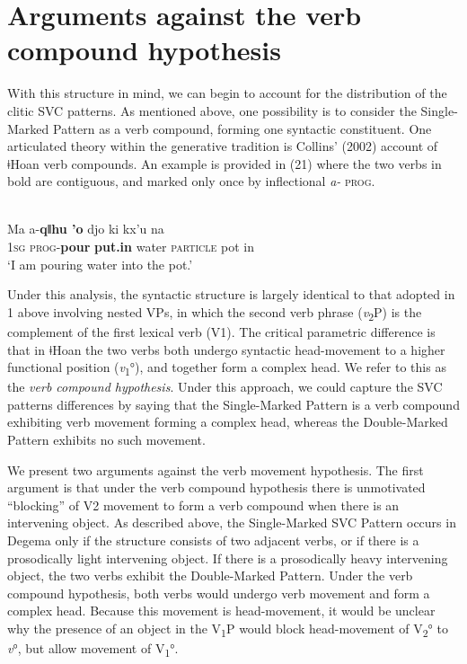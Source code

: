 \documentclass[output=paper]{langsci/langscibook}
\begin{document}
\section{Arguments against the verb compound hypothesis}
\label{bkm:Ref449523633}
With this structure in mind, we can begin to account for the distribution of the clitic SVC patterns. As mentioned above, one possibility is to consider the Single-Marked Pattern as a verb compound, forming one syntactic constituent. One articulated theory within the generative tradition is Collins’ (2002) account of ǂHoan verb compounds. An example is provided in (21) where the two verbs in bold are contiguous, and marked only once by inflectional \textit{a- }\textsc{prog}.

\ea
{}\\
\gll  Ma  a-\textbf{qǁhu    {\textbar}’o}    djo    ki      kx’u    na\\
     \textsc{1sg}   \textsc{prog}{}-\textbf{pour}  \textbf{put.in}  water  \textsc{particle}  pot    in\\
\glt ‘I am pouring water into the pot.’ \citep[1]{Collins2002}
\z

Under this analysis, the syntactic structure is largely identical to that adopted in 1 above involving nested VPs, in which the second verb phrase (\textit{v}\textsubscript{2}P) is the complement of the first lexical verb (V1). The critical parametric difference is that in ǂHoan the two verbs both undergo syntactic head-movement to a higher functional position (\textit{v}\textsubscript{1}°), and together form a complex head. We refer to this as the \textit{verb compound hypothesis}. Under this approach, we could capture the SVC patterns differences by saying that the Single-Marked Pattern is a verb compound exhibiting verb movement forming a complex head, whereas the Double-Marked Pattern exhibits no such movement. 

We present two arguments against the verb movement hypothesis. The first argument is that under the verb compound hypothesis there is unmotivated “blocking” of V2 movement to form a verb compound when there is an intervening object. As described above, the Single-Marked SVC Pattern occurs in Degema only if the structure consists of two adjacent verbs, or if there is a prosodically light intervening object. If there is a prosodically heavy intervening object, the two verbs exhibit the Double-Marked Pattern. Under the verb compound hypothesis, both verbs would undergo verb movement and form a complex head. Because this movement is head-movement, it would be unclear why the presence of an object in the V\textsubscript{1}P would block head-movement of V\textsubscript{2}° to \textit{v}°, but allow movement of V\textsubscript{1}°.
\end{document}
